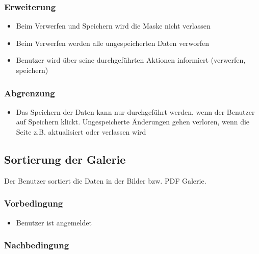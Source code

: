 \documentclass[a4paper,12pt]{article}
\begin{document}
\subsubsection{Erweiterung}\label{erweiterung-5}

\begin{itemize}

\item
  Beim Verwerfen und Speichern wird die Maske nicht verlassen
\item
  Beim Verwerfen werden alle ungespeicherten Daten verworfen
\item
  Benutzer wird über seine durchgeführten Aktionen informiert
  (verwerfen, speichern)
\end{itemize}

\subsubsection{Abgrenzung}\label{abgrenzung-5}

\begin{itemize}

\item
  Das Speichern der Daten kann nur durchgeführt werden, wenn der
  Benutzer auf Speichern klickt. Ungespeicherte Änderungen gehen
  verloren, wenn die Seite z.B. aktualisiert oder verlassen wird
\end{itemize}

\clearpage

\subsection{Sortierung der Galerie}\label{benutzer-sortiert-daten-in-der-bilderpdf-galerie}
Der Benutzer sortiert die Daten in der Bilder bzw. PDF Galerie.

\subsubsection{Vorbedingung}\label{vorbedingung-6}

\begin{itemize}

\item
  Benutzer ist angemeldet
\end{itemize}

\subsubsection{Nachbedingung}\label{nachbedingung-6}
\end{document}
